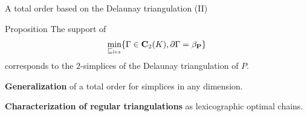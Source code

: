 \begin{frame}{A total order based on the Delaunay triangulation (II)}
\small
\begin{minipage}{0.6\linewidth}
\begin{block}{\small Proposition}
The support of
\[
	\min_{\sqsubseteq_{lex}} \{ \Gamma \in \mathbf{C}_2(K), \partial \Gamma = \beta_{\mathbf{P}} \}
\]
corresponds to the $2$-simplices of the Delaunay triangulation of $P$.
\end{block}
\end{minipage}%
\begin{minipage}{0.4\linewidth}
\end{minipage}

\vspace{0.5cm}

\textbf{Generalization} of a total order for simplices in any dimension.

\textbf{Characterization of regular triangulations} as lexicographic optimal chains.
\end{frame}

